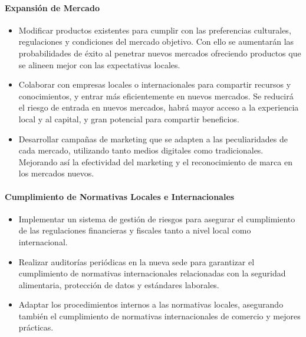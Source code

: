     \paragraph*{Expansión de Mercado}
        \begin{itemize}
            \item Modificar productos existentes para cumplir con las preferencias culturales, regulaciones y condiciones del mercado objetivo. Con ello se aumentarán las probabilidades de éxito al penetrar nuevos mercados ofreciendo productos que se alineen mejor con las expectativas locales.
            \item Colaborar con empresas locales o internacionales para compartir recursos y conocimientos, y entrar más eficientemente en nuevos mercados. Se reducirá el riesgo de entrada en nuevos mercados, habrá mayor acceso a la experiencia local y al capital, y gran potencial para compartir beneficios.
            \item Desarrollar campañas de marketing que se adapten a las peculiaridades de cada mercado, utilizando tanto medios digitales como tradicionales. Mejorando así la efectividad del marketing y el reconocimiento de marca en los mercados nuevos.
        \end{itemize}
    
    \paragraph*{Cumplimiento de Normativas Locales e Internacionales}
        \begin{itemize}
            \item Implementar un sistema de gestión de riesgos para asegurar el cumplimiento de las regulaciones financieras y fiscales tanto a nivel local como internacional.
            \item Realizar auditorías periódicas en la nueva sede para garantizar el cumplimiento de normativas internacionales relacionadas con la seguridad alimentaria, protección de datos y estándares laborales.
            \item Adaptar los procedimientos internos a las normativas locales, asegurando también el cumplimiento de normativas internacionales de comercio y mejores prácticas.
        \end{itemize}

